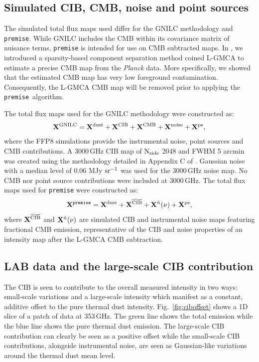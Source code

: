 \documentclass[a4paper,fleqn,usenatbib]{mnras}
\newcommand{\premise}{\texttt{premise}}
\begin{document}
\subsection{Simulated CIB, CMB, noise and point sources}
\label{sec:simCIB}

The simulated total flux maps used differ for the GNILC methodology and {\texttt{premise}}. While GNILC includes the CMB within its covariance matrix of nuisance terms, {\texttt{premise}} is intended for use on CMB subtracted maps. In \cite{lgmca}, we introduced a sparsity-based component separation method coined L-GMCA to estimate a precise CMB map from the {\it{Planck}} data. More specifically, we showed that the estimated CMB map has very low foreground contamination. Consequently, the L-GMCA CMB map will be removed prior to applying the \premise \, algorithm. 

The total flux maps used for the GNILC methodology were constructed as: 
\begin{eqnarray}
{\bf{X}}^{\rm{GNILC}} =  {\bf{X}}^{\rm{dust}} +  {\bf{X}}^{\rm{CIB}} +  {\bf{X}}^{\rm{CMB}}  +   {\bf{X}}^{\rm{noise}}  + {\bf{X}}^{\rm{ps}},
\label{eq:gnilcTotS}
\end{eqnarray}
where the FFP8 simulations provide the instrumental noise, point sources and CMB contributions. A 3000\,GHz CIB map of $\rm{N_{side}}$ 2048 and FWHM 5 arcmin was created using the methodology detailed in Appendix C of \citet{pr2}.  Gaussian noise with a median level of 0.06 MJy $\rm{sr}^{-1}$ \citep{pr2} was used for the 3000\,GHz noise map. No CMB nor point source contributions were included at 3000\,GHz.
The total flux maps used for {\texttt{premise}} were constructed as: 
\begin{eqnarray}
{\bf{X}}^{\rm{{\texttt{premise}}}} = {\bf{X}}^{\rm{dust}} + {\bf{X}}^{\rm{\widetilde{CIB}}} +  {\bf{X}}^{\tilde{n}}(\nu)  + {\bf{X}}^{\rm{ps}},
\label{eq:waveTotS}
\end{eqnarray}
where ${\bf{X}}^{\rm{\widetilde{CIB}}}$  and ${\bf{X}}^{\tilde{n}}(\nu)$ are simulated CIB and instrumental noise maps featuring fractional CMB emission, representative of the CIB and noise properties of an intensity map after the L-GMCA CMB subtraction.

\subsection{LAB data and the large-scale CIB contribution}

The CIB is seen to contribute to the overall measured intensity in two ways: small-scale variations and a large-scale intensity which manifest as a constant, additive offset to the pure thermal dust intensity. Fig.~\ref{fig:ciboffset} shows a 1D slice of a patch of data at 353\,GHz. The green line shows the total emission while the blue line shows the pure thermal dust emission. The large-scale CIB contribution can clearly be seen as a positive offset while the small-scale CIB contributions, alongside instrumental noise, are seen as Gaussian-like variations around the thermal dust mean level. 
\end{document}
